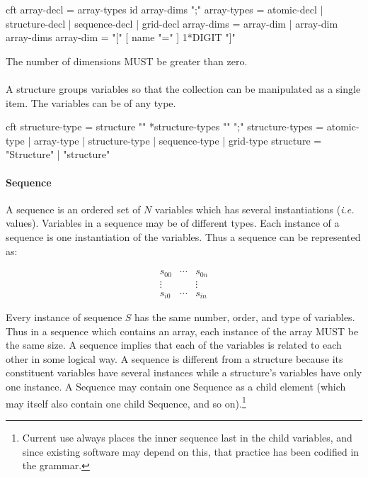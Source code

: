 \documentclass[justify]{nasa-ese}
\begin{document}
\begin{vcode}{cft}
array-decl  = array-types id array-dims ";" 
array-types = atomic-decl | structure-decl | sequence-decl | grid-decl 
array-dims  = array-dim | array-dim array-dims 
array-dim   = "[" [ name "=" ] 1*DIGIT "]" 
\end{vcode}

The number of dimensions MUST be greater than zero.

\paragraph{\Structure}
\label{sec:structure}
 A structure groups variables so that the collection can be
  manipulated as a single item. The variables can be of any type.

\begin{vcode}{cft}
structure-type  = structure "{" *structure-types "}" ";" 
structure-types = atomic-type | array-type 
                  | structure-type | sequence-type | grid-type 
structure       = "Structure" | "structure"
\end{vcode}
              
\paragraph{Sequence}
\label{sec:sequence}
A sequence is an ordered set of $N$ variables which has several
instantiations ({\it i.e.} values). Variables in a sequence may be of
different types. Each instance of a sequence is one instantiation of
the variables. Thus a sequence can be represented as:

\begin{displaymath}
\begin{array}{ccc}
  s_{0 0} & \cdots & s_{0 n} \\
  \vdots & & \vdots \\
  s_{i 0} & \cdots & s_{i n}
\end{array}
\end{displaymath}

\noindent Every instance of sequence $S$ has the same number, order,
and type of variables. Thus in a sequence which contains an array,
each instance of the array MUST be the same size. A sequence implies
that each of the variables is related to each other in some logical
way. A sequence is different from a structure because its constituent
variables have several instances while a structure's variables have
only one instance. A Sequence may contain one Sequence as a child
element (which may itself also contain one child Sequence, and so
on).\footnote{Current use always places the inner sequence last in the
  child variables, and since existing software may depend on this,
  that practice has been codified in the grammar.}
\label{sequence-grammar}
\end{document}
